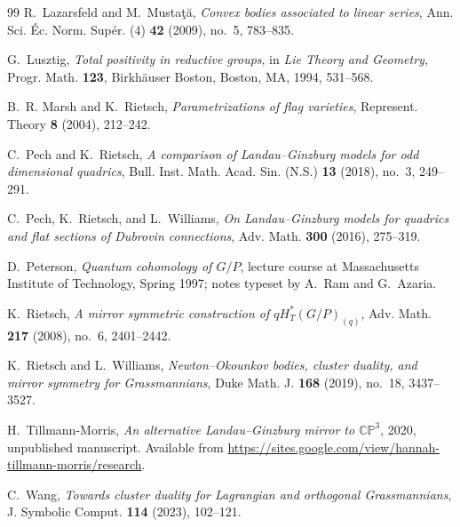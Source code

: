 \begin{thebibliography}{99}
R.~Lazarsfeld and M.~Musta\c{t}\u{a},
\emph{Convex bodies associated to linear series},
Ann. Sci. \'Ec. Norm. Sup\'er. (4) \textbf{42} (2009), no.~5, 783--835.

G.~Lusztig,
\emph{Total positivity in reductive groups},
in \emph{Lie Theory and Geometry}, Progr. Math. \textbf{123},
Birkh\"auser Boston, Boston, MA, 1994, 531--568.

B.~R. Marsh and K.~Rietsch,
\emph{Parametrizations of flag varieties},
Represent. Theory \textbf{8} (2004), 212--242.

C.~Pech and K.~Rietsch,
\emph{A comparison of Landau--Ginzburg models for odd dimensional quadrics},
Bull. Inst. Math. Acad. Sin. (N.S.) \textbf{13} (2018), no.~3, 249--291.

C.~Pech, K.~Rietsch, and L.~Williams,
\emph{On Landau--Ginzburg models for quadrics and flat sections of Dubrovin connections},
Adv. Math. \textbf{300} (2016), 275--319.

D.~Peterson,
\emph{Quantum cohomology of \(G/P\)},
lecture course at Massachusetts Institute of Technology, Spring 1997;
notes typeset by A.~Ram and G.~Azaria.

K.~Rietsch,
\emph{A mirror symmetric construction of \(qH_T^*(G/P)_{(q)}\)},
Adv. Math. \textbf{217} (2008), no.~6, 2401--2442.

K.~Rietsch and L.~Williams,
\emph{Newton--Okounkov bodies, cluster duality, and mirror symmetry for Grassmannians},
Duke Math. J. \textbf{168} (2019), no.~18, 3437--3527.

H.~Tillmann-Morris,
\emph{An alternative Landau--Ginzburg mirror to \(\mathbb{CP}^3\)},
2020, unpublished manuscript. Available from
\url{https://sites.google.com/view/hannah-tillmann-morris/research}.

C.~Wang,
\emph{Towards cluster duality for Lagrangian and orthogonal Grassmannians},
J. Symbolic Comput. \textbf{114} (2023), 102--121.

\end{thebibliography}
